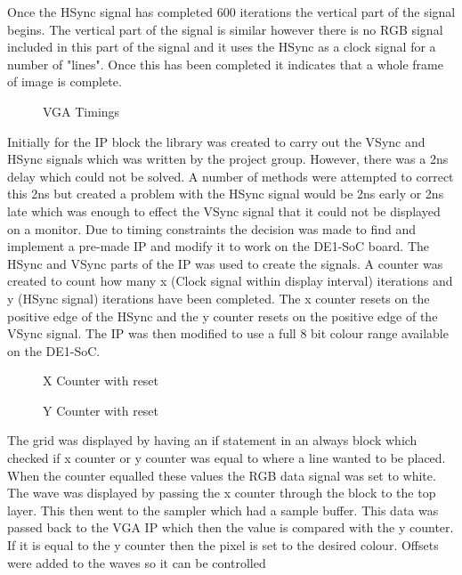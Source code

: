 \documentclass[a4paper,12pt]{article}
\begin{document}
\begin{flushleft}
Once the HSync signal has completed 600 iterations the vertical part of the signal begins. The vertical part of the signal is similar however there is no RGB signal included in this part of the signal and it uses the HSync as a clock signal for a number of "lines". Once this has been completed it indicates that a whole frame of image is complete.
\begin{figure}[H]
	\centering
	\caption{VGA Timings \cite{terasic_2014}}
\end{figure}
Initially for the IP block the library was created to carry out the VSync and HSync signals which was written by the project group. However, there was a 2ns delay which could not be solved. A number of methods were attempted to correct this 2ns but created a problem with the HSync signal would be 2ns early or 2ns late which was enough to effect the VSync signal that it could not be displayed on a monitor. Due to timing constraints the decision was made to find and implement a pre-made IP and modify it to work on the DE1-SoC board.\cite{stump_2012} The HSync and VSync parts of the IP was used to create the signals. A counter was created to count how many x (Clock signal within display interval) iterations and y (HSync signal) iterations have been completed. The x counter resets on the positive edge of the HSync and the y counter resets on the positive edge of the VSync signal. The IP was then modified to use a full 8 bit colour range available on the DE1-SoC. 
\begin{figure}[H]
	\centering
	
		\caption{X Counter with reset}
\end{figure}
	\begin{figure}[H]
	\centering
	
	\caption{Y Counter with reset}
\end{figure}
The grid was displayed by having an if statement in an always block which checked if x counter or y counter was equal to where a line wanted to be placed. When the counter equalled these values the RGB data signal was set to white. The wave was displayed by passing the x counter through the block to the top layer. This then went to the sampler which had a sample buffer. This data was passed back to the VGA IP which then the value is compared with the y counter. If it is equal to the y counter then the pixel is set to the desired colour. Offsets were added to the waves so it can be controlled 
\end{flushleft}
\newpage
\end{document}
